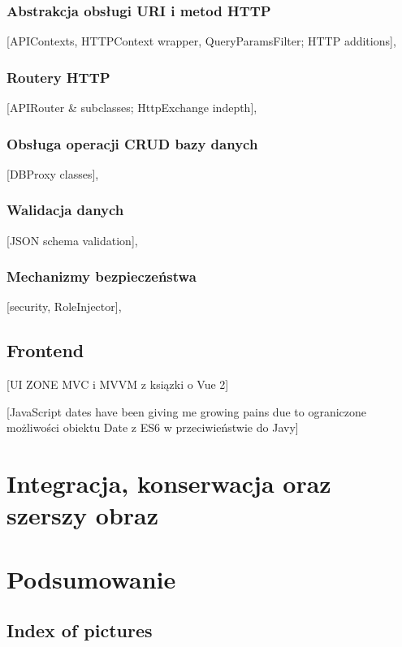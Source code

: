 \documentclass[12pt, a4paper]{article}
\begin{document}
\subsubsection{Abstrakcja obsługi URI i metod HTTP}
[APIContexts, HTTPContext wrapper, QueryParamsFilter; HTTP additions],

\subsubsection{Routery HTTP}
[APIRouter \& subclasses; HttpExchange indepth],

\subsubsection{Obsługa operacji CRUD bazy danych}
[DBProxy classes],

\subsubsection{Walidacja danych}
[JSON schema validation],

\subsubsection{Mechanizmy bezpieczeństwa}
[security, RoleInjector],

\subsection{Frontend}
[UI ZONE
MVC i MVVM z ksiązki o Vue 2]


[JavaScript dates have been giving me growing pains due to ograniczone możliwości obiektu Date z ES6 w przeciwieństwie do Javy]

\section{Integracja, konserwacja oraz szerszy obraz}
\section*{Podsumowanie}

\medskip

\printbibliography[title={Bibliografia}]

\subsection*{Index of pictures}
\end{document}
